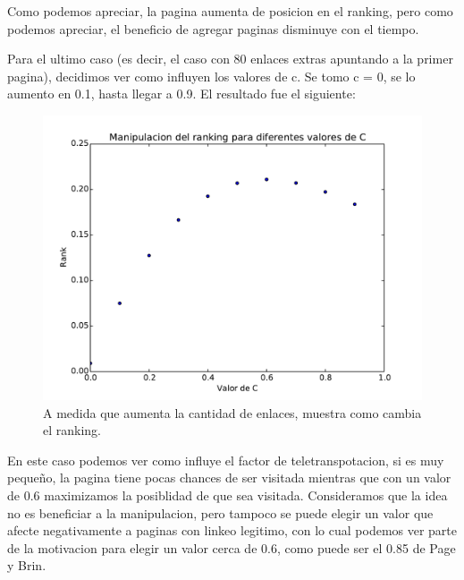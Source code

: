 Como podemos apreciar, la pagina aumenta de posicion en el ranking, pero como podemos apreciar, el beneficio de agregar paginas disminuye con el tiempo.

Para el ultimo caso (es decir, el caso con 80 enlaces extras apuntando a la primer pagina), decidimos ver como influyen los valores de c. Se tomo c = 0, se lo aumento en 0.1, hasta llegar a 0.9. El resultado fue el siguiente:

\begin{figure}[H]
\centering
\includegraphics[scale=0.7]{images/manipulacionC.pdf}
\caption{A medida que aumenta la cantidad de enlaces, muestra como cambia el ranking.}
\label{timePageRank}
\end{figure}

En este caso podemos ver como influye el factor de teletranspotacion, si es muy pequeño, la pagina tiene pocas chances de ser visitada mientras que con un valor de 0.6 maximizamos la posiblidad de que sea visitada. Consideramos que la idea no es beneficiar a la manipulacion, pero tampoco se puede elegir un valor que afecte negativamente a paginas con linkeo legitimo, con lo cual podemos ver parte de la motivacion para elegir un valor cerca de 0.6, como puede ser el 0.85 de Page y Brin.
